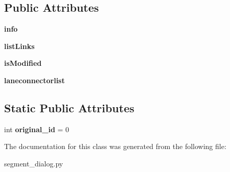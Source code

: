 \subsection*{Public Attributes}
\begin{DoxyCompactItemize}
\item 
\hypertarget{class_sim_g_d_c_1_1segment__dialog_1_1_segment_dialog_a96bd24afac6e0bbe351807e5fb9210ed}{}{\bfseries info}\label{class_sim_g_d_c_1_1segment__dialog_1_1_segment_dialog_a96bd24afac6e0bbe351807e5fb9210ed}

\item 
\hypertarget{class_sim_g_d_c_1_1segment__dialog_1_1_segment_dialog_a4a09903d04e82e83ff0f02916cf3289a}{}{\bfseries list\+Links}\label{class_sim_g_d_c_1_1segment__dialog_1_1_segment_dialog_a4a09903d04e82e83ff0f02916cf3289a}

\item 
\hypertarget{class_sim_g_d_c_1_1segment__dialog_1_1_segment_dialog_aa58d6ec9b8afd33faa93902a8e74fde6}{}{\bfseries is\+Modified}\label{class_sim_g_d_c_1_1segment__dialog_1_1_segment_dialog_aa58d6ec9b8afd33faa93902a8e74fde6}

\item 
\hypertarget{class_sim_g_d_c_1_1segment__dialog_1_1_segment_dialog_a3620ae05efa6a97aa76cc1dc364b0b88}{}{\bfseries laneconnectorlist}\label{class_sim_g_d_c_1_1segment__dialog_1_1_segment_dialog_a3620ae05efa6a97aa76cc1dc364b0b88}

\end{DoxyCompactItemize}
\subsection*{Static Public Attributes}
\begin{DoxyCompactItemize}
\item 
\hypertarget{class_sim_g_d_c_1_1segment__dialog_1_1_segment_dialog_aa516c418b1814a56e0c0a3111d9d3546}{}int {\bfseries original\+\_\+id} = 0\label{class_sim_g_d_c_1_1segment__dialog_1_1_segment_dialog_aa516c418b1814a56e0c0a3111d9d3546}

\end{DoxyCompactItemize}


The documentation for this class was generated from the following file\+:\begin{DoxyCompactItemize}
\item 
segment\+\_\+dialog.\+py\end{DoxyCompactItemize}
